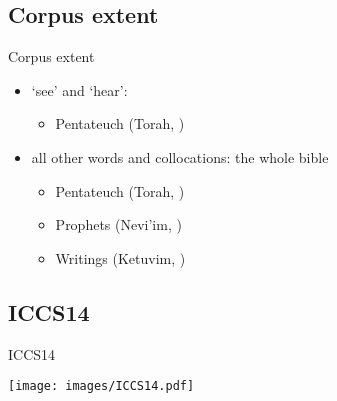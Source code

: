 \subsection{Corpus extent}

\begin{frame}{Corpus extent}
	\begin{itemize}
		\item {} ‘see’ and  ‘hear’:
			\begin{itemize}
				\item {Pentateuch \quad\scriptsize (Torah, )}
			\end{itemize}
		\item all other words and collocations: the whole bible
			\begin{itemize}
				\item {Pentateuch \quad\scriptsize (Torah, )}
				\item {Prophets \quad\scriptsize (Nevi’im, )}
				\item {Writings \quad\scriptsize (Ketuvim, )}
			\end{itemize}
	\end{itemize}
\end{frame}



\subsection{ICCS14}

\begin{frame}{ICCS14}
	\begin{center}
		\texttt{[image: images/ICCS14.pdf]}
	\end{center}
\end{frame}
